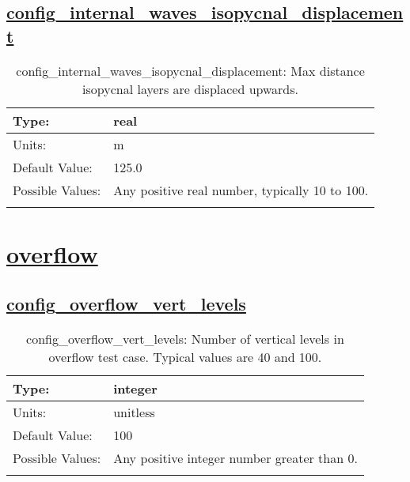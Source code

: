 \subsection[config\_internal\_waves\_isopycnal\_displacement]{\hyperref[sec:nm_tab_internal_waves]{config\_internal\_waves\_isopycnal\_displacement}}
\label{subsec:nm_sec_config_internal_waves_isopycnal_displacement}
\begin{center}
\begin{longtable}{| p{2.0in} || p{4.0in} |}
    \hline
    Type: & real \\
    \hline
    Units: & \si{m} \\
    \hline
    Default Value: & 125.0 \\
    \hline
    Possible Values: & Any positive real number, typically 10 to 100. \\
    \hline
    \caption{config\_internal\_waves\_isopycnal\_displacement: Max distance isopycnal layers are displaced upwards.}
\end{longtable}
\end{center}
\section[overflow]{\hyperref[sec:nm_tab_overflow]{overflow}}
\label{sec:nm_sec_overflow}
\subsection[config\_overflow\_vert\_levels]{\hyperref[sec:nm_tab_overflow]{config\_overflow\_vert\_levels}}
\label{subsec:nm_sec_config_overflow_vert_levels}
\begin{center}
\begin{longtable}{| p{2.0in} || p{4.0in} |}
    \hline
    Type: & integer \\
    \hline
    Units: & \si{unitless} \\
    \hline
    Default Value: & 100 \\
    \hline
    Possible Values: & Any positive integer number greater than 0. \\
    \hline
    \caption{config\_overflow\_vert\_levels: Number of vertical levels in overflow test case. Typical values are 40 and 100.}
\end{longtable}
\end{center}
